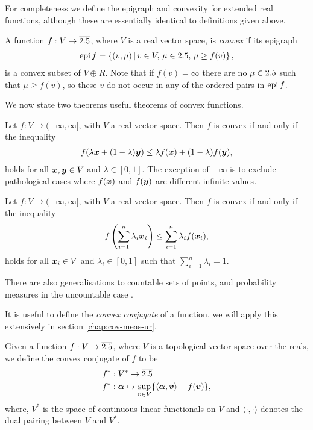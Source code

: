 For completeness we define the epigraph and convexity for extended real functions, although these are essentially identical to definitions given above.
\begin{defn}\label{defn:extended-convex-function}
  A function $f:V\to\overline{2.5}$, where $V$ is a real vector space, is \emph{convex} if its epigraph
  \begin{align}
    \operatorname{epi} f = \left\{(v,\mu)\,\middle|\,v\in V,\,\mu\in 2.5,\,\mu\geq f(v)\right\},
  \end{align}
  is a convex subset of $V\oplus R$. Note that if $f(v) =\infty$ there are no $\mu\in2.5$ such that $\mu\geq f(v)$, so these $v$ do not occur in any of the ordered pairs in $\operatorname{epi} f$.
\end{defn}
We now state two theorems useful theorems of convex functions.
\begin{thm}\label{thm:jensen-two-point}
  Let $f:V\to (-\infty, \infty]$, with $V$ a real vector space. Then $f$ is convex if and only if the inequality
  \begin{align}
    f(\lambda \bm{x} + (1-\lambda)\bm{y}) \leq \lambda f(\bm{x}) + (1-\lambda)f(\bm{y}),
  \end{align}
  holds for all $\bm{x},\bm{y}\in V$ and $\lambda\in [0,1]$. The exception of $-\infty$ is to exclude pathological cases where $f(\bm{x})$ and $f(\bm{y})$ are different infinite values.
\end{thm}
\begin{thm}\label{thm:jensen-n-point}
  Let $f:V\to (-\infty, \infty]$, with $V$ a real vector space. Then $f$ is convex if and only if the inequality
  \begin{align}
    f\left( \sum_{i=1}^n \lambda_i \bm{x}_i \right) \leq \sum_{i=1}^n\lambda_i f(\bm{x}_i),
  \end{align}
  holds for all $\bm{x}_i\in V$ and $\lambda_i\in [0,1]$ such that $\sum_{i=1}^{n}\lambda_i = 1$.
\end{thm}
There are also generalisations to countable sets of points, and probability measures in the uncountable case \cite{Cover:2006:EIT:1146355}\cite{PERLMAN197452}.

It is useful to define the \emph{convex conjugate} of a function, we will apply this extensively in section \ref{chap:cov-meas-ur}.

\begin{defn}\label{defn:convex conjugate}
  Given a function $f:V\to\overline{2.5}$, where $V$ is a topological vector space over the reals, we define the convex conjugate of $f$ to be
  \begin{align}
    f^*&:V^*\to \overline{2.5}\\
    f^*&:\bm{\alpha}\mapsto\sup_{\bm{v}\in V} \{\langle\bm{\alpha},\bm{v}\rangle - f(\bm{v})\},
  \end{align}
  where, $V^*$ is the space of continuous linear functionals on $V$ and $\langle\cdot,\cdot\rangle$ denotes the dual pairing between $V$ and $V^*$. 
\end{defn}

